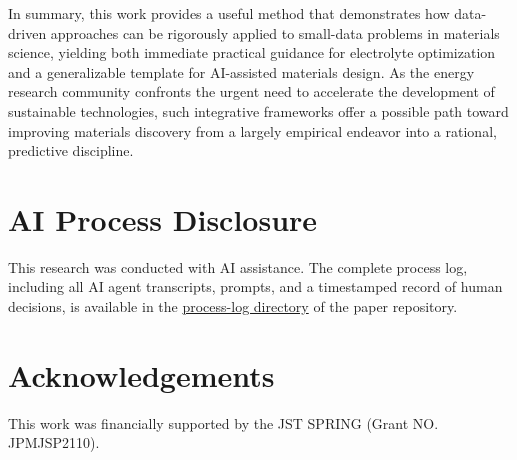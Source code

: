 \documentclass[11pt, a4paper]{article}
\newcommand{\repourl}{https://github.com/author/repo}
\begin{document}
In summary, this work provides a useful method that demonstrates how data-driven approaches can be rigorously applied to small-data problems in materials science, yielding both immediate practical guidance for electrolyte optimization and a generalizable template for AI-assisted materials design. As the energy research community confronts the urgent need to accelerate the development of sustainable technologies, such integrative frameworks offer a possible path toward improving materials discovery from a largely empirical endeavor into a rational, predictive discipline.

\section*{AI Process Disclosure}

This research was conducted with AI assistance. The complete process log,
including all AI agent transcripts, prompts, and a timestamped record of
human decisions, is available in the
\href{\repourl/tree/main/process-log}{process-log directory} of the
paper repository.


\section*{Acknowledgements}

This work was financially supported by the JST SPRING (Grant NO. JPMJSP2110).


\printbibliography[title={References}]
\end{document}
